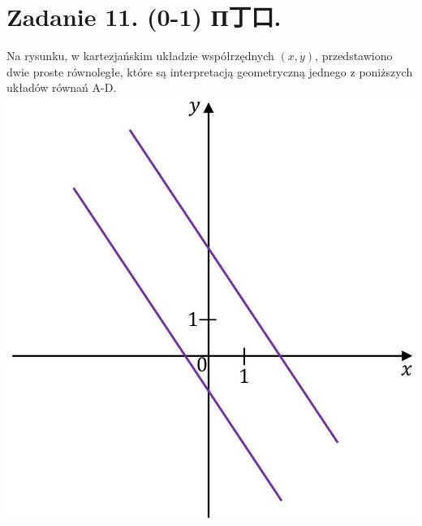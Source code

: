\documentclass[10pt]{article}
\begin{document}
\section*{Zadanie 11. (0-1) П丁口.}
Na rysunku, w kartezjańskim układzie współrzędnych \((x, y)\), przedstawiono dwie proste równoległe, które są interpretacją geometryczną jednego z poniższych układów równań A-D.\\
\includegraphics[max width=\textwidth, center]{2024_11_21_daeb5e5efb43dd4cb535g-11(1)}
\end{document}
